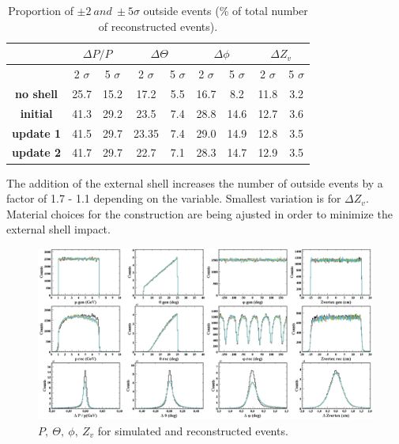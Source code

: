 \documentclass[11pt,a4paper,english]{article}
\begin{document}
\begin{table}[h!]
\centering
\begin{tabular}{|c|c|c|c|c|c|c|c|c|}
\hline
                  & \multicolumn{2}{c|}{\textbf{$\Delta P/P$}} & \multicolumn{2}{c|}{\textbf{$\Delta \Theta$}} & \multicolumn{2}{c|}{\textbf{$\Delta \phi$}} & \multicolumn{2}{c|}{\textbf{$\Delta Z_v$}} \\ \hline
                  & 2 $\sigma$         & 5 $\sigma$ & 2 $\sigma$          & 5 $\sigma$          & 2 $\sigma$         & 5 $\sigma$         & 2 $\sigma$         & 5 $\sigma$        \\ \hline
\textbf{no shell} & 25.7            & 15.2 & 17.2             & 5.5              & 16.7            & 8.2             & 11.8            & 3.2            \\ \hline
\textbf{initial}  & 41.3            & 29.2 & 23.5             & 7.4              & 28.8            & 14.6            & 12.7            & 3.6            \\ \hline
\textbf{update 1} & 41.5            & 29.7 & 23.35            & 7.4              & 29.0            & 14.9            & 12.8            & 3.5            \\ \hline
\textbf{update 2} & 41.7            & 29.7 & 22.7             & 7.1              & 28.3            & 14.7            & 12.9            & 3.5            \\ \hline
\end{tabular}
\caption{Proportion of $\pm 2 \ and\ \pm5 \sigma$ outside events (\% of total number of reconstructed events).}
\label{table_resol}
\end{table}

The addition of the external shell increases the number of outside events by a factor of 1.7 - 1.1 depending on the variable. Smallest variation is for $\Delta Z_v$. Material choices for the construction are being ajusted in order to minimize the external shell impact. 

\begin{figure}[h!]
\centering
\includegraphics[width=1.0\textwidth]{generated_reconstructed_variables_MC.png}
\caption{$P,\ \Theta,\ \phi,\ Z_v$ for simulated and reconstructed events.}
\label{fig_resol}
\end{figure}
\end{document}

